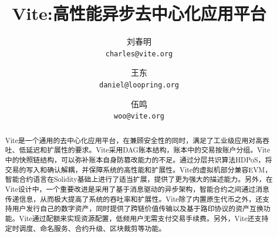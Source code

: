 \documentclass[UTF8,nofonts]{ctexart}
\title{\textbf{Vite:}\textbf{高性能异步去中心化应用平台}}
\author{
  刘春明\\
  \texttt{charles@vite.org}\\
  \and
  王东\\
  \texttt{daniel@loopring.org}\\
  \and
  伍鸣\\
  \texttt{woo@vite.org}\\
 }
\date{}
\begin{document}
\maketitle

\begin{abstract}
Vite是一个通用的去中心化应用平台，在兼顾安全性的同时，满足了工业级应用对高吞吐、低延迟和扩展性的要求。Vite采用DAG账本结构，账本中的交易按账户分组。Vite中的快照链结构，可以弥补账本自身防篡改能力的不足。通过分层共识算法HDPoS，将交易的写入和确认解耦，并保障系统的高性能和扩展性。Vite的虚拟机部分兼容EVM，智能合约语言在Solidity基础上进行了适当扩展，提供了更为强大的描述能力。另外，在Vite设计中，一个重要改进是采用了基于消息驱动的异步架构，智能合约之间通过消息传递信息，从而极大提高了系统的吞吐率和扩展性。Vite除了内置原生代币之外，还支持用户发行自己的数字资产，同时提供了跨链价值传输以及基于路印协议\cite{loopring}的资产互换功能。Vite通过配额来实现资源配置，低频用户无需支付交易手续费。另外，Vite还支持定时调度、命名服务、合约升级、区块裁剪等功能。
\end{abstract}
\end{document}
